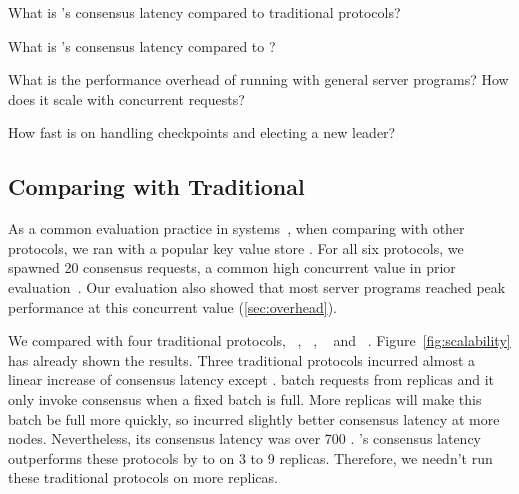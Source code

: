 \begin{tightenum}

\item[\S\ref{sec:eval-traditional}:] What is \xxx's consensus latency compared
to traditional \paxos protocols?

\item[\S\ref{sec:eval-dare}:] What is \xxx's consensus latency compared
to \dare?

\item[\S\ref{sec:overhead}:] What is the performance overhead of running \xxx
with general server programs? How does it scale with concurrent requests?


\item[\S\ref{sec:robust}:] How fast is \xxx on handling checkpoints and
electing a new leader?



\end{tightenum}




\subsection{Comparing with Traditional \paxos}
\label{sec:eval-traditional}

As a common evaluation practice in 
\paxos systems~\cite{dare:hpdc15,nopaxos:osdi16}, when comparing \xxx with 
other \paxos protocols, we ran \xxx with a popular key value store \redis. For 
all six \paxos protocols, we spawned 20 consensus requests, a common high 
concurrent value in prior 
evaluation~\cite{zookeeper,crane:sosp15,rex:eurosys14}. Our evaluation also 
showed that most server programs reached peak performance at this concurrent 
value (\ref{sec:overhead}).

We compared \xxx with four traditional protocols, \libpaxos~\cite{libpaxos},
\zookeeper~\cite{zookeeper}, \crane~\cite{crane:sosp15} and
\spaxos~\cite{spaxos:srds12}. Figure~\ref{fig:scalability} has already shown 
the results. Three traditional protocols incurred almost a linear increase of 
consensus latency except \spaxos. \spaxos batch requests from replicas and it 
only invoke consensus when a fixed batch is full. More replicas will make this 
batch be full more quickly, so \spaxos incurred slightly better consensus 
latency at more nodes. Nevertheless, its consensus latency was over 700 \us. 
\xxx's consensus latency outperforms these protocols by \comptradlow to 
\comptradhigh on 3 to 9 replicas. Therefore, we needn't run these traditional 
protocols on more replicas.

